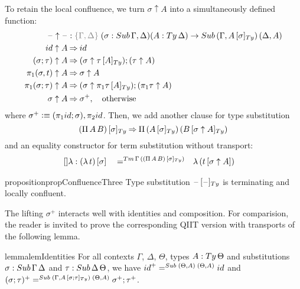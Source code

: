 \documentclass[a4paper,UKenglish,numberwithinsect,cleveref,thm-restate]{lipics-v2021}
\newcommand{\danger}{\marginpar[\hfill\dbend]{\dbend\hfill}}
\begin{document}
To retain the local confluence, we turn $\sigma \uparrow A$ into a simultaneously defined function:
\begin{alignat}{3}
  \blank\uparrow \blank & : \implicit{\Gamma, \Delta}\; (\sigma : \Sub\,\Gamma,\Delta) (A : \Ty\,\Delta) \to \Sub\,(\Gamma, \subTy{A}{\sigma})\, (\Delta, A) \label{eq:type-of-lifting} \\
\idS                \uparrow A & \reduce \idS \nonumber \\
(\sigma ; \tau)     \uparrow A & \reduce (\sigma \uparrow \subTy{\tau}{A} ) ; (\tau \uparrow A) \nonumber \\
\pi_1(\sigma, t)    \uparrow A & \reduce \sigma \uparrow A \nonumber \\
\pi_1(\sigma; \tau) \uparrow A & \reduce (\sigma \uparrow \subTy{\pi_1 \tau}{A}) ; (\pi_1 \tau \uparrow A)\nonumber \\
\sigma              \uparrow A & \reduce \sigma^+ , \quad \text{otherwise} \nonumber
\end{alignat}
where $\sigma^+ \defeq (\pi_1\idS ; \sigma), \pi_2\idS$.
Then, we add another clause for type substitution
\begin{equation*}
  \subTy{(\Pi\,A\,B)}{\sigma} \reduce \Pi\,(\subTy{A}{\sigma})\,(\subTy{B}{\sigma\uparrow A}) %
\end{equation*}
and an equality constructor for term substitution without transport:
\begin{alignat}{5}
  \mathsf{[]\lambda} :{} & \sub{(\lambda\,t)}{\sigma} && =^{\Tm\,\Gamma\,(\subTy{(\Pi\,A\,B)}{\sigma})} && \lambda\,(\sub{t}{\sigma \uparrow A}) \nonumber
\end{alignat}

\begin{restatable}{proposition}{propConfluenceThree}\label{prop:local-confluence-3}
  Type substitution $\subTy{\blank}{\blank}$ is terminating and locally confluent.
    \danger
\end{restatable}

The lifting $\sigma^+$ interacts well with identities and composition.
For comparision, the reader is invited to prove the corresponding QIIT version with transports of the following lemma.
%
\begin{restatable}{lemma}{lemIdentities}\label{lem:lifting}
  For all contexts $\Gamma$, $\Delta$, $\Theta$, types $A : \Ty\,\Theta$ and substitutions $\sigma : \Sub\,\Gamma\,\Delta$ and $\tau : \Sub\,\Delta\,\Theta$, we have $\idS^+ =^{\Sub\;(\Theta, A)\;(\Theta, A)} \idS$ and $(\sigma; \tau)^+     =^{\Sub\;(\Gamma, \subTy{A}{\sigma; \tau})\;(\Theta, A)} \sigma^+ ; \tau^+$.
\end{restatable}
\end{document}
